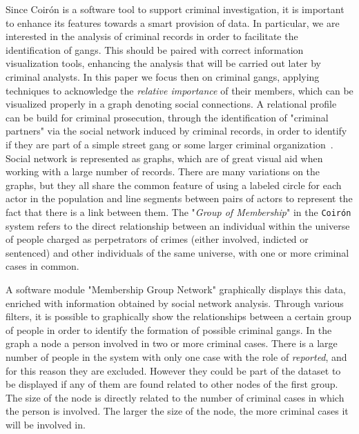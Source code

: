 Since Coirón is a software tool to support criminal investigation, it is important to enhance its features towards a smart provision of data.
In particular, we are interested in the analysis of criminal records in order to facilitate the identification of gangs. 
This should be paired with correct information visualization tools, enhancing the analysis that will be carried out later by criminal analysts.
In this paper we focus then on criminal gangs, applying techniques to acknowledge the \textit{relative importance} of their members, which can be visualized properly in a graph denoting social connections.
A relational profile can be build for criminal prosecution, through the identification of "criminal partners" via the social network induced by criminal records, in order to identify if they are part of a simple street gang or some larger criminal organization~\cite{rua2020perspective}. 
Social network is represented as graphs, which are of great visual aid when working with a large number of records.
There are many variations on the graphs, but they all share the common feature of using a labeled circle for each actor in the population and line segments between pairs of actors to represent the fact that there is a link between them. 
The "\textit{Group of Membership}" in the \texttt{Coirón} system refers to the direct relationship between an individual within the universe of people charged as perpetrators of crimes (either involved, indicted or sentenced) and other individuals of the same universe, with one or more criminal cases in common.

A software module "Membership Group Network" graphically displays this data, enriched with information obtained by social network analysis. 
Through various filters, it is possible to graphically show the relationships between a certain group of people in order to identify the formation of possible criminal gangs.
In the graph a node a person involved in two or more criminal cases.
There is a large number of people in the system with only one case with the role of \textit{reported}, and for this reason they are excluded. 
However they could be part of the dataset to be displayed if any of them are found related to other nodes of the first group. 
The size of the node is directly related to the number of criminal cases in which the person is involved. The larger the size of the node, the more criminal cases it will be involved in.

